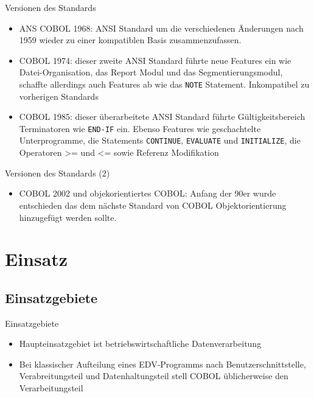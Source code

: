 \documentclass[handout]{beamer}
\begin{document}
\begin{frame}{Versionen des Standards}
	\begin{itemize}
		\item
			ANS COBOL 1968: ANSI Standard um die verschiedenen \"Anderungen nach 1959 wieder zu einer kompatiblen Basis zusammenzufassen.
		\item
			COBOL 1974: dieser zweite ANSI Standard f\"uhrte neue Features ein wie Datei-Organisation, das Report Modul und das Segmentierungsmodul, schaffte allerdings auch Features ab wie das \texttt{NOTE} Statement. Inkompatibel zu vorherigen Standards
		\item
			COBOL 1985: dieser \"uberarbeitete ANSI Standard f\"uhrte G\"ultigkeitsbereich Terminatoren wie \texttt{END-IF} ein. Ebenso Features wie geschachtelte Unterprogramme, die Statements \texttt{CONTINUE}, \texttt{EVALUATE} und \texttt{INITIALIZE}, die Operatoren >= und <= sowie Referenz Modifikation
	\end{itemize}
\end{frame}

\begin{frame}{Versionen des Standards (2)}
		\begin{itemize}
			\item
				COBOL 2002 und objekorientiertes COBOL: Anfang der 90er wurde entschieden das dem n\"achste Standard von COBOL Objektorientierung hinzugef\"ugt werden sollte.
		\end{itemize}
\end{frame}

\section{Einsatz}

\subsection{Einsatzgebiete}

\begin{frame}{Einsatzgebiete}
	\begin{itemize}
		\item
			Haupteinsatzgebiet ist betriebswirtschaftliche Datenverarbeitung
		\item
			Bei klassischer Aufteilung eines EDV-Programms nach Benutzerschnittstelle, Verabreitungsteil und Datenhaltungsteil stell COBOL \"ublicherweise den Verarbeitungsteil
	\end{itemize}
\end{frame}
\end{document}
